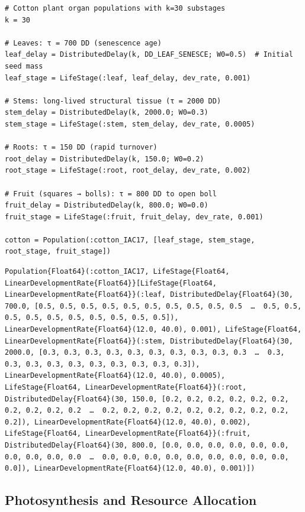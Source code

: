 \begin{verbatim}
# Cotton plant organ populations with k=30 substages
k = 30

# Leaves: τ = 700 DD (senescence age)
leaf_delay = DistributedDelay(k, DD_LEAF_SENESCE; W0=0.5)  # Initial seed mass
leaf_stage = LifeStage(:leaf, leaf_delay, dev_rate, 0.001)

# Stems: long-lived structural tissue (τ = 2000 DD)
stem_delay = DistributedDelay(k, 2000.0; W0=0.3)
stem_stage = LifeStage(:stem, stem_delay, dev_rate, 0.0005)

# Roots: τ = 150 DD (rapid turnover)
root_delay = DistributedDelay(k, 150.0; W0=0.2)
root_stage = LifeStage(:root, root_delay, dev_rate, 0.002)

# Fruit (squares → bolls): τ = 800 DD to open boll
fruit_delay = DistributedDelay(k, 800.0; W0=0.0)
fruit_stage = LifeStage(:fruit, fruit_delay, dev_rate, 0.001)

cotton = Population(:cotton_IAC17, [leaf_stage, stem_stage, root_stage, fruit_stage])
\end{verbatim}




\begin{verbatim}
Population{Float64}(:cotton_IAC17, LifeStage{Float64, LinearDevelopmentRate{Float64}}[LifeStage{Float64, LinearDevelopmentRate{Float64}}(:leaf, DistributedDelay{Float64}(30, 700.0, [0.5, 0.5, 0.5, 0.5, 0.5, 0.5, 0.5, 0.5, 0.5, 0.5  …  0.5, 0.5, 0.5, 0.5, 0.5, 0.5, 0.5, 0.5, 0.5, 0.5]), LinearDevelopmentRate{Float64}(12.0, 40.0), 0.001), LifeStage{Float64, LinearDevelopmentRate{Float64}}(:stem, DistributedDelay{Float64}(30, 2000.0, [0.3, 0.3, 0.3, 0.3, 0.3, 0.3, 0.3, 0.3, 0.3, 0.3  …  0.3, 0.3, 0.3, 0.3, 0.3, 0.3, 0.3, 0.3, 0.3, 0.3]), LinearDevelopmentRate{Float64}(12.0, 40.0), 0.0005), LifeStage{Float64, LinearDevelopmentRate{Float64}}(:root, DistributedDelay{Float64}(30, 150.0, [0.2, 0.2, 0.2, 0.2, 0.2, 0.2, 0.2, 0.2, 0.2, 0.2  …  0.2, 0.2, 0.2, 0.2, 0.2, 0.2, 0.2, 0.2, 0.2, 0.2]), LinearDevelopmentRate{Float64}(12.0, 40.0), 0.002), LifeStage{Float64, LinearDevelopmentRate{Float64}}(:fruit, DistributedDelay{Float64}(30, 800.0, [0.0, 0.0, 0.0, 0.0, 0.0, 0.0, 0.0, 0.0, 0.0, 0.0  …  0.0, 0.0, 0.0, 0.0, 0.0, 0.0, 0.0, 0.0, 0.0, 0.0]), LinearDevelopmentRate{Float64}(12.0, 40.0), 0.001)])
\end{verbatim}



\subsection{Photosynthesis and Resource Allocation}




